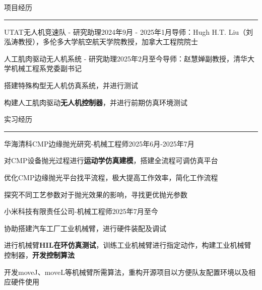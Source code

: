 \documentclass{resume} %
\renewenvironment{rSection}[1]{
\sectionskip
\textcolor{TsinghuaPurple}{\MakeUppercase{#1}}
\sectionlineskip
\hrule
\begin{list}{}{
\setlength{\leftmargin}{0em}
}
\item[]
}{
\end{list}
}
\begin{document}
\begin{rSection}{项目经历}
\begin{rSubsection}{UTAT无人机竞速队 - 研究助理}{2024年9月 - 2025年1月}{导师：Hugh H.T. Liu（刘泓涛教授），多伦多大学航空航天学院教授，加拿大工程院院士}{}
\end{rSubsection}

\begin{rSubsection}{人工肌肉驱动无人机系统 - 研究助理}{2025年2月至今}{导师：赵慧婵副教授，清华大学机械工程系党委副书记}{}
    \item 搭建特殊构型无人机仿真系统，并进行测试
    \item 构建人工肌肉驱动\textbf{无人机控制器}，并进行前期仿真环境测试
\end{rSubsection}

\end{rSection} 

\begin{rSection}{实习经历}

\begin{rSubsection}{华海清科CMP边缘抛光研究-机械工程师}{2025年6月-2025年7月}{}{}
    \item 对CMP设备抛光过程进行\textbf{运动学仿真建模}，搭建全流程可调仿真平台
    \item 优化CMP边缘抛光平台找平流程，极大提高工作效率，简化工作流程
    \item 探究不同工艺参数对于抛光效果的影响，寻找更优抛光参数    
\end{rSubsection}

\begin{rSubsection}{小米科技有限责任公司-机械工程师}{2025年7月至今}{}{}
    \item 协助搭建汽车工厂工业机械臂，进行硬件装配及调试
    \item 进行机械臂\textbf{HIL在环仿真测试}，训练工业机械臂进行指定动作，构建工业机械臂控制器，\textbf{开发控制算法}
    \item 开发moveJ、moveL等机械臂所需算法，重构开源项目以方便队友配置环境以及相应硬件使用
\end{rSubsection}

\end{rSection}

\end{document}
